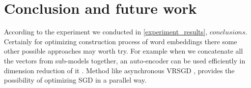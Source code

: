 \section{Conclusion and future work}
According to the experiment we conducted in \ref{experiment_results}, $conclusions$. Certainly for optimizing construction process of word embeddings there some other possible approaches may worth try. For example when we concatenate all the vectors from sub-models together, an auto-encoder can be used efficiently in dimension reduction of it \cite{hinton2006reducing}. Method like asynchronous VRSGD \cite{keuperasynchronous}, \cite{keuper2015asynchronous} provides the possibility of optimizing SGD in a parallel way.
